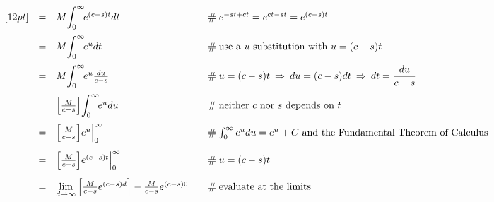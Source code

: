 \documentclass{article}
\theoremstyle{definition}
\begin{document}
\begin{equation*}
\begin{array}{lllll}
[12pt]                                                                                 %
&=& M \mathlarger{\int}_0^\infty\! e^{(c-s)t}  dt                 &\quad  \mathrel{\#}  e^{-st + ct} = e^{ct -st} = e^{(c-s)t}                                                                                                                                      \\      
[12pt]                                                                                 %
&=&  M \mathlarger{\int}_0^\infty \! e^u dt                         &\quad  \mathrel{\#} \text{use a $u$ substitution with $u = (c-s)t$}                                                                                                                     \\     
[12pt]                                                                                 %
&=&  M \mathlarger{\int}_0^\infty \! e^u \frac{du}{c-s}       &\quad  \mathrel{\#} u = (c-s)t  \: \Rightarrow \: du = (c-s) dt \: \Rightarrow \: dt = \dfrac{du}{c-s}                                                                       \\     
[12pt]                                                                                %
&=& \Big [ \frac{M}{c-s} \Big ] \mathlarger{\int}_0^\infty \! e^u du                                    &\quad  \mathrel{\#} \text{neither $c$ nor $s$ depends on $t$}                                                                            \\     
[12pt]                                                                                %
&=& \Big [ \frac{M}{c-s} \Big ] e^u \Big |_0^\infty              &\quad  \mathrel{\#} \int_0^\infty e^u du = e^u +C \text{ and the Fundamental Theorem of Calculus}                                                                \\     
[12pt]                                                                                %
&=& \Big [ \frac{M}{c-s} \Big ]  e^{(c-s)t} \Big |_0^\infty     &\quad  \mathrel{\#} u = (c-s)t                                                                                                                                                                              \\
[12pt]                                                                                %
&=& \lim\limits_{d \to \infty}\Big [\frac{M}{c-s} e^{(c-s)d} \Big ] - \frac{M}{c - s}e^{(c-s)0}  &\quad \mathrel{\#} \text{evaluate at the limits}                                                                                                   \\

\end{array}
\end{equation*}
\end{document}
